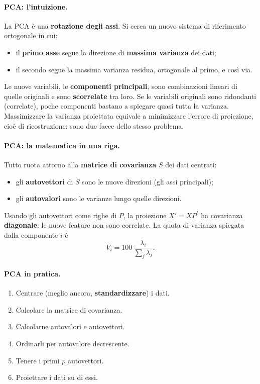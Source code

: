 \paragraph*{PCA: l'intuizione.}
La PCA è una \textbf{rotazione degli assi}. Si cerca un nuovo sistema di riferimento ortogonale in cui:
\begin{itemize}
    \item il \textbf{primo asse} segue la direzione di \textbf{massima varianza} dei dati;
    \item il secondo segue la massima varianza residua, ortogonale al primo, e così via.
\end{itemize}
Le nuove variabili, le \textbf{componenti principali}, sono combinazioni lineari di quelle originali e sono \textbf{scorrelate} tra loro. Se le variabili originali sono ridondanti (correlate), poche componenti bastano a spiegare quasi tutta la varianza. Massimizzare la varianza proiettata equivale a minimizzare l'errore di proiezione, cioè di ricostruzione: sono due facce dello stesso problema.

\paragraph*{PCA: la matematica in una riga.}
Tutto ruota attorno alla \textbf{matrice di covarianza} $S$ dei dati centrati:
\begin{itemize}
    \item gli \textbf{autovettori} di $S$ sono le nuove direzioni (gli assi principali);
    \item gli \textbf{autovalori} sono le varianze lungo quelle direzioni.
\end{itemize}
Usando gli autovettori come righe di $P$, la proiezione $X' = XP^t$ ha covarianza \textbf{diagonale}: le nuove feature non sono correlate. La quota di varianza spiegata dalla componente $i$ è
\[
    V_i = 100\,\frac{\lambda_i}{\sum_j \lambda_j}.
\]

\paragraph*{PCA in pratica.}
\begin{enumerate}
    \item Centrare (meglio ancora, \textbf{standardizzare}) i dati.
    \item Calcolare la matrice di covarianza.
    \item Calcolarne autovalori e autovettori.
    \item Ordinarli per autovalore decrescente.
    \item Tenere i primi $p$ autovettori.
    \item Proiettare i dati su di essi.
\end{enumerate}

